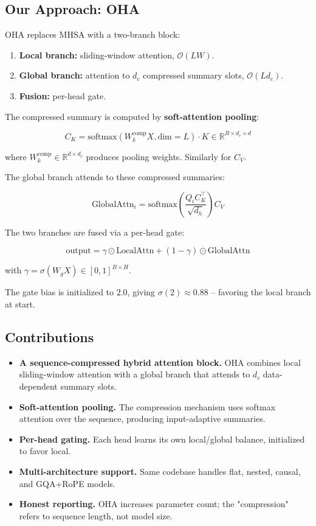 \subsection{Our Approach: OHA}

OHA replaces MHSA with a two-branch block:

\begin{enumerate}
\item \textbf{Local branch:} sliding-window attention, $\mathcal{O}(L W)$.
\item \textbf{Global branch:} attention to $d_c$ compressed summary slots,
  $\mathcal{O}(L d_c)$.
\item \textbf{Fusion:} per-head gate.

\end{enumerate}
The compressed summary is computed by \textbf{soft-attention pooling}:

\[
C_K = \text{softmax}(W_k^\text{comp} X, \text{dim}=L) \cdot K \in \mathbb{R}^{B \times d_c \times d}
\]

where $W_k^\text{comp} \in \mathbb{R}^{d \times d_c}$ produces pooling weights. 
Similarly for $C_V$.

The global branch attends to these compressed summaries:

\[
\text{GlobalAttn}_i = \text{softmax}\!\left(\frac{Q_i C_K^\top}{\sqrt{d_h}}\right) C_V
\]

The two branches are fused via a per-head gate:

\[
\text{output} = \gamma \odot \text{LocalAttn} + (1 - \gamma) \odot \text{GlobalAttn}
\]

with $\gamma = \sigma(W_g X) \in [0, 1]^{B \times H}$.

The gate bias is initialized to $2.0$, giving $\sigma(2) \approx 0.88$ -- 
favoring the local branch at start.

\subsection{Contributions}

\begin{itemize}
\item \textbf{A sequence-compressed hybrid attention block.} OHA combines local
  sliding-window attention with a global branch that attends to $d_c$
  data-dependent summary slots.
\item \textbf{Soft-attention pooling.} The compression mechanism uses softmax
  attention over the sequence, producing input-adaptive summaries.
\item \textbf{Per-head gating.} Each head learns its own local/global balance,
  initialized to favor local.
\item \textbf{Multi-architecture support.} Same codebase handles flat, nested,
  causal, and GQA+RoPE models.
\item \textbf{Honest reporting.} OHA increases parameter count; the "compression"
  refers to sequence length, not model size.

\end{itemize}
